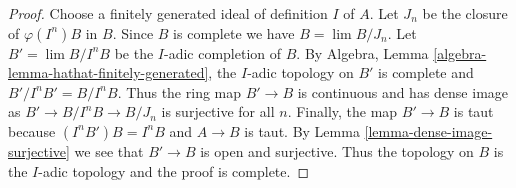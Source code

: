 \documentclass{stacks-project}
\theoremstyle{plain}
\theoremstyle{definition}
\theoremstyle{remark}
\numberwithin{equation}{subsection}
\def\lim{\mathop{\mathrm{lim}}\nolimits}
\begin{document}
\begin{proof}
Choose a finitely generated ideal of definition $I$ of $A$.
Let $J_n$ be the closure of $\varphi(I^n)B$ in $B$.
Since $B$ is complete we have $B = \lim B/J_n$.
Let $B' = \lim B/I^nB$ be the $I$-adic completion of $B$.
By Algebra, Lemma \ref{algebra-lemma-hathat-finitely-generated},
the $I$-adic topology on $B'$ is complete and
$B'/I^nB' = B/I^nB$. Thus the ring map $B' \to B$ is continuous
and has dense image as $B' \to B/I^nB \to B/J_n$ is surjective
for all $n$. Finally, the map $B' \to B$ is taut
because $(I^nB')B = I^nB$ and $A \to B$ is taut.
By Lemma \ref{lemma-dense-image-surjective} we see that $B' \to B$ is open
and surjective. Thus the topology on $B$ is the $I$-adic topology
and the proof is complete.
\end{proof}
\end{document}
